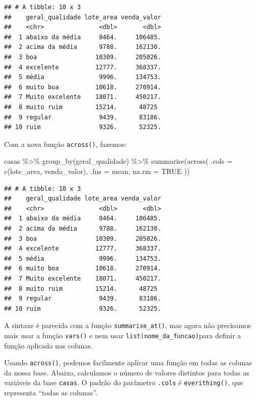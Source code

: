 \documentclass[
]{book}
\newenvironment{Shaded}{\begin{snugshade}}{\end{snugshade}}
\newcommand{\AttributeTok}[1]{\textcolor[rgb]{0.77,0.63,0.00}{#1}}
\newcommand{\ConstantTok}[1]{\textcolor[rgb]{0.00,0.00,0.00}{#1}}
\newcommand{\FunctionTok}[1]{\textcolor[rgb]{0.00,0.00,0.00}{#1}}
\newcommand{\NormalTok}[1]{#1}
\newcommand{\SpecialCharTok}[1]{\textcolor[rgb]{0.00,0.00,0.00}{#1}}
\begin{document}
\begin{verbatim}
## # A tibble: 10 x 3
##    geral_qualidade lote_area venda_valor
##    <chr>               <dbl>       <dbl>
##  1 abaixo da média     8464.     106485.
##  2 acima da média      9788.     162130.
##  3 boa                10309.     205026.
##  4 excelente          12777.     368337.
##  5 média               9996.     134753.
##  6 muito boa          10618.     270914.
##  7 Muito excelente    18071.     450217.
##  8 muito ruim         15214.      48725 
##  9 regular             9439.      83186.
## 10 ruim                9326.      52325.
\end{verbatim}

Com a nova função \texttt{across()}, fazemos:

\begin{Shaded}
\begin{Highlighting}[]
\NormalTok{casas }\SpecialCharTok{\%\textgreater{}\%}
  \FunctionTok{group\_by}\NormalTok{(geral\_qualidade) }\SpecialCharTok{\%\textgreater{}\%}
  \FunctionTok{summarise}\NormalTok{(}\FunctionTok{across}\NormalTok{(}
    \AttributeTok{.cols =} \FunctionTok{c}\NormalTok{(lote\_area, venda\_valor),}
    \AttributeTok{.fns =}\NormalTok{ mean, }
    \AttributeTok{na.rm =} \ConstantTok{TRUE}
\NormalTok{  ))}
\end{Highlighting}
\end{Shaded}

\begin{verbatim}
## # A tibble: 10 x 3
##    geral_qualidade lote_area venda_valor
##    <chr>               <dbl>       <dbl>
##  1 abaixo da média     8464.     106485.
##  2 acima da média      9788.     162130.
##  3 boa                10309.     205026.
##  4 excelente          12777.     368337.
##  5 média               9996.     134753.
##  6 muito boa          10618.     270914.
##  7 Muito excelente    18071.     450217.
##  8 muito ruim         15214.      48725 
##  9 regular             9439.      83186.
## 10 ruim                9326.      52325.
\end{verbatim}

A sintaxe é parecida com a função \texttt{summarise\_at()}, mas agora não precisamos mais usar a função \texttt{vars()} e nem usar \texttt{list(nome\_da\_funcao)}para definir a função aplicada nas colunas.

Usando \texttt{across()}, podemos facilmente aplicar uma função em todas as colunas da nossa base. Abaixo, calculamos o número de valores distintos para todas as variáveis da base \texttt{casas}. O padrão do parâmetro \texttt{.cols} é \texttt{everithing()}, que representa ``todas as colunas''.
\end{document}
